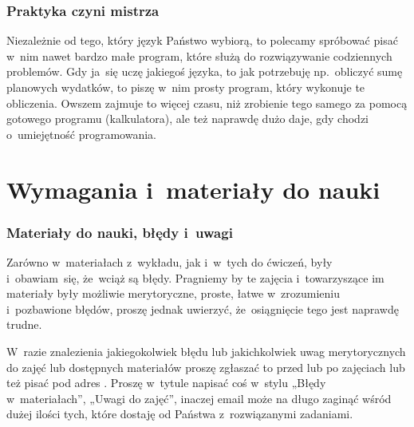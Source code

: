 \documentclass[10pt,t]{beamer}
\begin{document}
\begin{frame}
  \frametitle{Praktyka czyni mistrza}


  Niezależnie od tego, który język Państwo wybiorą, to polecamy spróbować
  pisać w~nim nawet bardzo małe program, które służą do rozwiązywanie
  codziennych problemów. Gdy ja~się uczę jakiegoś języka, to jak potrzebuję
  np.~obliczyć sumę planowych wydatków, to piszę w~nim prosty program, który
  wykonuje te obliczenia. Owszem zajmuje to więcej czasu, niż zrobienie
  tego samego za pomocą gotowego programu (kalkulatora), ale też
  naprawdę dużo daje, gdy chodzi o~umiejętność programowania.

\end{frame}










\section{Wymagania i~materiały do nauki}


\begin{frame}
  \frametitle{Materiały do nauki, błędy i~uwagi}


  Zarówno w~materiałach z~wykładu, jak i~w~tych do ćwiczeń, były
  i~obawiam~się, że~wciąż są błędy. Pragniemy by te zajęcia i~towarzyszące
  im materiały były możliwie merytoryczne, proste, łatwe w~zrozumieniu
  i~pozbawione błędów, proszę jednak uwierzyć, że~osiągnięcie tego jest
  naprawdę trudne.

  W~razie znalezienia jakiegokolwiek błędu lub jakichkolwiek uwag
  merytorycznych do zajęć lub dostępnych materiałów proszę zgłaszać to
  przed lub po zajęciach lub też pisać pod adres \email. Proszę w~tytule
  napisać coś w~stylu „Błędy w~materiałach”, „Uwagi do zajęć”, inaczej
  email może na długo zaginąć wśród dużej ilości tych, które dostaję od
  Państwa z~rozwiązanymi zadaniami.

\end{frame}
\end{document}
